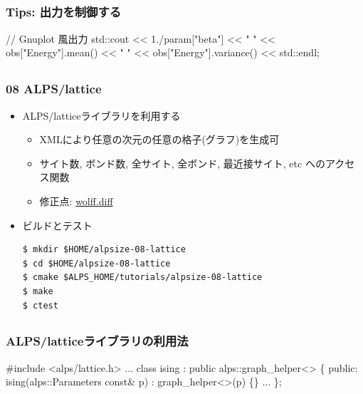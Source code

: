 \subsection*{\redm\whitem\greenb}
\begin{frame}[fragile,shrink=10]
\frametitle{Tips: 出力を制御する}
\begin{semiverbatim}
// Gnuplot 風出力
std::cout << 1./param["beta"] << " "
          << obs["Energy"].mean() << " "
          << obs["Energy"].variance() << std::endl;
\end{semiverbatim}
\end{frame}

\subsection*{\redm\whitem\greenb}
\begin{frame}[fragile]
  \frametitle{08 ALPS/lattice}
  \begin{itemize}
    \item ALPS/latticeライブラリを利用する
      \begin{itemize}
        \item XMLにより任意の次元の任意の格子(グラフ)を生成可
        \item サイト数, ボンド数, 全サイト, 全ボンド, 最近接サイト, etc へのアクセス関数
        \item 修正点: \href{https://github.com/cmsi/alps-tutorial/blob/develop/alpsize/08-wolff.diff}{wolff.diff}
      \end{itemize}
    \item ビルドとテスト
\begin{lstlisting}
$ mkdir $HOME/alpsize-08-lattice
$ cd $HOME/alpsize-08-lattice
$ cmake $ALPS_HOME/tutorials/alpsize-08-lattice
$ make
$ ctest
\end{lstlisting}
  \end{itemize}
\end{frame}

\subsection*{\redm\whitem\greenb}
\begin{frame}[fragile] \frametitle{ALPS/latticeライブラリの利用法}
\begin{semiverbatim}
#include <alps/lattice.h>
...
class ising : public alps::graph_helper<> \{
 public:
  ising(alps::Parameters const& p)
   : \alert{graph_helper<>(p)} \{\}
...
\};
\end{semiverbatim}
\end{frame}

